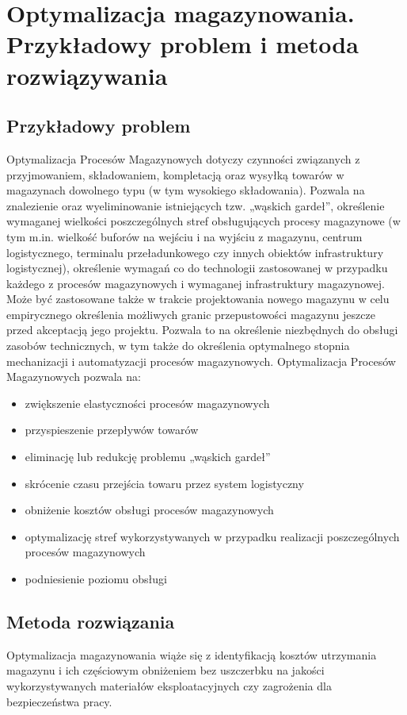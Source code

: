 \section{Optymalizacja magazynowania. Przykładowy problem i metoda
rozwiązywania}
\subsection{Przykładowy problem}

Optymalizacja Procesów Magazynowych dotyczy czynności związanych z przyjmowaniem, składowaniem, kompletacją oraz wysyłką towarów w magazynach dowolnego typu (w tym wysokiego składowania). Pozwala na znalezienie oraz wyeliminowanie istniejących tzw. „wąskich gardeł”, określenie wymaganej wielkości poszczególnych stref obsługujących procesy magazynowe (w tym m.in. wielkość buforów na wejściu i na wyjściu z magazynu, centrum logistycznego, terminalu przeładunkowego czy innych obiektów infrastruktury logistycznej), określenie wymagań co do technologii zastosowanej w przypadku każdego z procesów magazynowych i wymaganej infrastruktury magazynowej. Może być zastosowane także w trakcie projektowania nowego magazynu w celu empirycznego określenia możliwych granic przepustowości magazynu jeszcze przed akceptacją jego projektu. Pozwala to na określenie niezbędnych do obsługi zasobów technicznych, w tym także do określenia optymalnego stopnia mechanizacji i automatyzacji procesów magazynowych.
Optymalizacja Procesów Magazynowych pozwala na:
\begin{itemize}
\item zwiększenie elastyczności procesów magazynowych
\item przyspieszenie przepływów towarów
\item eliminację lub redukcję problemu „wąskich gardeł”
\item skrócenie czasu przejścia towaru przez system logistyczny
\item obniżenie kosztów obsługi procesów magazynowych
\item optymalizację stref wykorzystywanych w przypadku realizacji poszczególnych procesów magazynowych
\item podniesienie poziomu obsługi
\end{itemize}

\subsection{Metoda rozwiązania}
Optymalizacja magazynowania wiąże się z identyfikacją kosztów utrzymania magazynu i ich częściowym obniżeniem bez uszczerbku na jakości wykorzystywanych materiałów eksploatacyjnych czy zagrożenia dla bezpieczeństwa pracy.
